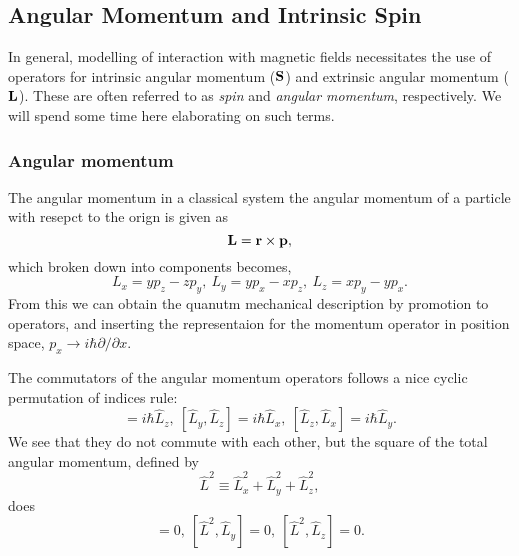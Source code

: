     \subsection{Angular Momentum and Intrinsic Spin}

    In general, modelling of interaction with magnetic fields necessitates the 
    use of operators for intrinsic angular momentum ($\vb{S}$) and extrinsic 
    angular momentum ($\vb{L}$). These are often referred to as \emph{spin} 
    and \emph{angular momentum}, respectively.
    We will spend some time here elaborating on such terms.

    \subsubsection{Angular momentum}
    The angular momentum in a classical system the angular momentum of a particle with 
    resepct to the orign is given as
    \begin{equation}
        \vb{L} = \vb{r} \times \vb{p},
    \end{equation}
    which broken down into components becomes,
    \begin{equation}
        L_x = y p_z - z p_y,\ 
        L_y = y p_x - x p_z,\ 
        L_z = x p_y - y p_x.
    \end{equation}
    From this we can obtain the quanutm mechanical description by promotion to operators,
    and inserting the representaion for the momentum operator in position space,
    $p_x \to i\hbar \partial / \partial x$.

    The commutators of the angular momentum operators follows a nice cyclic permutation 
    of indices rule:
    \begin{equation}
        [\hat{L}_x, \hat{L}_y] = i\hbar \hat{L}_z, \  
        [\hat{L}_y, \hat{L}_z] = i\hbar \hat{L}_x, \ 
        [\hat{L}_z, \hat{L}_x] = i\hbar \hat{L}_y.
    \end{equation}
    We see that they do not commute with each other, but the square of the total 
    angular momentum, defined by 
    \begin{equation}
        \hat{L}^2 \equiv \hat{L}_x^2 + \hat{L}_y^2 + \hat{L}_z^2,
    \end{equation}
    does
    \begin{equation}
        [\hat{L}^2, \hat{L}_x] = 0, \ 
        [\hat{L}^2, \hat{L}_y] = 0, \ 
        [\hat{L}^2, \hat{L}_z] = 0.
    \end{equation}

